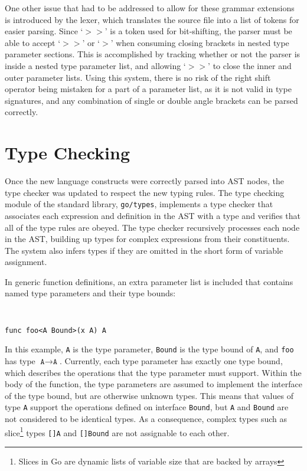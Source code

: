 \documentclass[letterpaper,twocolumn,11pt]{article}
\begin{document}
One other issue that had to be addressed to allow for these grammar extensions is introduced by the lexer, which translates the source file into a list of tokens for easier parsing. Since `\textbf{$>>$}' is a token used for bit-shifting, the parser must be able to accept `\textbf{$>>$}' or  `\textbf{$>$}' when consuming closing brackets in nested type parameter sections. This is accomplished by tracking whether or not the parser is inside a nested type parameter list, and allowing  `\textbf{$>>$}' to close the inner and outer parameter lists. Using this system, there is no risk of the right shift operator being mistaken for a part of a parameter list, as it is not valid in type signatures, and any combination of single or double angle brackets can be parsed correctly.

\section{Type Checking} \label{type_checking}

Once the new language constructs were correctly parsed into AST nodes, the type checker was updated to respect the new typing rules. The type checking module of the standard library, \texttt{go/types}, implements a type checker that associates each expression and definition in the AST with a type and verifies that all of the type rules are obeyed. The type checker recursively processes each node in the AST, building up types for complex expressions from their constituents. The system also infers types if they are omitted in the short form of variable assignment. 

In generic function definitions, an extra parameter list is included that contains named type parameters and their type bounds:

{ \tt \small
\begin{verbatim}
func foo<A Bound>(x A) A
\end{verbatim}
}

In this example, \texttt{A} is the type parameter, \texttt{Bound} is the type bound of \texttt{A}, and \texttt{foo} has type $\texttt{A} \rightarrow \texttt{A}$. Currently, each type parameter has exactly one type bound, which describes the operations that the type parameter must support. Within the body of the function, the type parameters are assumed to implement the interface of the type bound, but are otherwise unknown types. This means that values of type \texttt{A} support the operations defined on interface \texttt{Bound}, but \texttt{A} and \texttt{Bound} are not considered to be identical types. As a consequence, complex types such as slice\footnote{Slices in Go are dynamic lists of variable size that are backed by arrays} types \texttt{[]A} and \texttt{[]Bound} are not assignable to each other.
\end{document}
